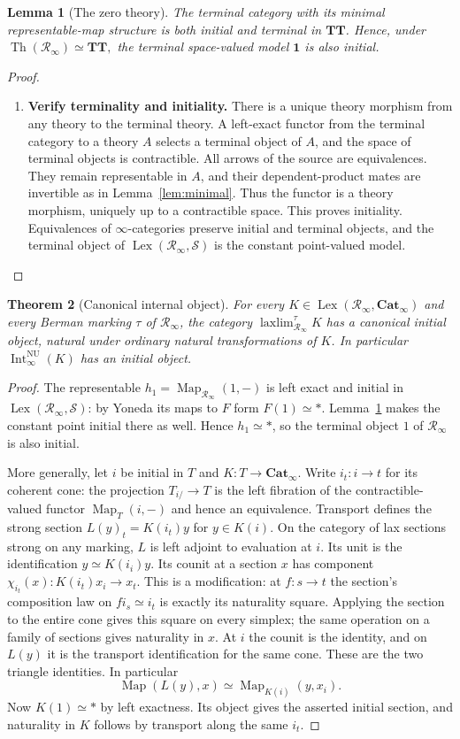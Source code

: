\documentclass[oneside]{article}
\theoremstyle{plain}
\newtheorem{theorem}{Theorem}[section]
\newtheorem{lemma}[theorem]{Lemma}
\theoremstyle{definition}
\theoremstyle{remark}
\newcommand{\Cat}{\mathbf{Cat}_{\infty}}
\newcommand{\Int}{\operatorname{Int}}
\newcommand{\Lex}{\operatorname{Lex}}
\newcommand{\Map}{\operatorname{Map}}
\newcommand{\NU}{\mathrm{NU}}
\newcommand{\RNU}{\mathcal R_{\infty}}
\newcommand{\Sps}{\mathcal S}
\newcommand{\TT}{\mathbf{TT}}
\newcommand{\Th}{\operatorname{Th}}
\newcommand{\laxlim}{\mathop{\mathrm{laxlim}}}
\newcommand{\one}{\mathbf 1}
\begin{document}
\begin{lemma}[The zero theory]\label{lem:zero}
The terminal category with its minimal representable-map structure is both initial and terminal in $\TT$. Hence, under $\Th(\RNU)\simeq\TT,$ the terminal space-valued model $\one$ is also initial.
\end{lemma}
\begin{proof}
\leavevmode
\begin{enumerate}
\item \textbf{Verify terminality and initiality.} There is a unique theory morphism from any theory to the terminal theory. A left-exact functor from the terminal category to a theory $A$ selects a terminal object of $A$, and the space of terminal objects is contractible. All arrows of the source are equivalences. They remain representable in $A$, and their dependent-product mates are invertible as in Lemma~\ref{lem:minimal}. Thus the functor is a theory morphism, uniquely up to a contractible space. This proves initiality. Equivalences of $\infty$-categories preserve initial and terminal objects, and the terminal object of $\Lex(\RNU,\Sps)$ is the constant point-valued model.\qedhere
\end{enumerate}
\end{proof}

\begin{theorem}[Canonical internal object]\label{thm:pointed}
For every $K\in\Lex(\RNU,\Cat)$ and every Berman marking $\tau$ of $\RNU$, the category $\laxlim_{\RNU}^{\tau}K$ has a canonical initial object,
natural under ordinary natural transformations of $K$. In particular
$\Int^{\NU}_\infty(K)$ has an initial object.
\end{theorem}
\begin{proof}
The representable $h_1=\Map_{\RNU}(1,-)$ is left exact and initial in
$\Lex(\RNU,\Sps)$: by Yoneda its maps to $F$ form $F(1)\simeq *$.
Lemma~\ref{lem:zero} makes the constant point initial there as well.
Hence $h_1\simeq *$, so the terminal object $1$ of $\RNU$ is also initial.

More generally, let $i$ be initial in $T$ and $K:T\to\Cat$.
Write $i_t:i\to t$ for its coherent cone: the projection
$T_{i/}\to T$ is the left fibration of the contractible-valued
functor $\Map_T(i,-)$ and hence an equivalence. Transport defines
the strong section $L(y)_t=K(i_t)y$ for $y\in K(i)$.
On the category of lax sections strong on any marking,
$L$ is left adjoint to evaluation at $i$. Its unit is the identification
$y\simeq K(i_i)y$. Its counit at a section $x$ has component
$\chi_{i_t}(x):K(i_t)x_i\to x_t$. This is a modification: at $f:s\to t$
the section's composition law on $f i_s\simeq i_t$ is exactly its
naturality square. Applying the section to the entire cone gives this
square on every simplex; the same operation on a family of sections
gives naturality in $x$. At $i$ the counit is the identity, and on
$L(y)$ it is the transport identification for the same cone. These
are the two triangle identities. In particular
\[
 \Map(L(y),x)\simeq\Map_{K(i)}(y,x_i).
\]
Now $K(1)\simeq *$ by left exactness. Its object gives the asserted
initial section, and naturality in $K$ follows by transport along the
same $i_t$.
\end{proof}
\end{document}
